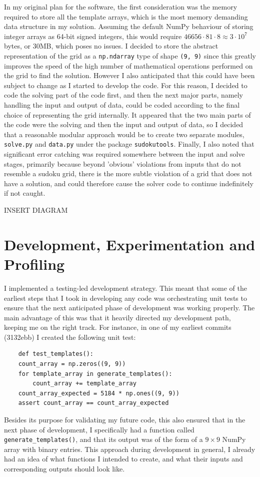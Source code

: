 \documentclass[12pt]{article}
\begin{document}
In my original plan for the software, the first consideration was the memory required to store all the template arrays, which is the most memory demanding data structure in my solution.
Assuming the default NumPy behaviour of storing integer arrays as 64-bit signed integers, this would require $46656\cdot81\cdot8\approx3\cdot10^7$ bytes, or 30MB, which poses no issues.
I decided to store the abstract representation of the grid as a \texttt{np.ndarray} type of shape \texttt{(9, 9)} since this greatly improves the speed of the high number of mathematical operations performed on the grid to find the solution.
However I also anticipated that this could have been subject to change as I started to develop the code.
For this reason, I decided to code the solving part of the code first, and then the next major parts, namely handling the input and output of data, could be coded according to the final choice of representing the grid internally.
It appeared that the two main parts of the code were the solving and then the input and output of data, so I decided that a reasonable modular approach would be to create two separate modules, \texttt{solve.py} and \texttt{data.py} under the package \texttt{sudokutools}.
Finally, I also noted that significant error catching was required somewhere between the input and solve stages, primarily because beyond 'obvious' violations from inputs that do not resemble a sudoku grid, there is the more subtle violation of a grid that does not have a solution, and could therefore cause the solver code to continue indefinitely if not caught.


INSERT DIAGRAM
\section*{Development, Experimentation and Profiling}
I implemented a testing-led development strategy.
This meant that some of the earliest steps that I took in developing any code was orchestrating unit tests to ensure that the next anticipated phase of development was working properly.
The main advantage of this was that it heavily directed my development path, keeping me on the right track.
For instance, in one of my earliest commits (3132ebb) I created the following unit test:

\begin{lstlisting}
    def test_templates():
    count_array = np.zeros((9, 9))
    for template_array in generate_templates():
        count_array += template_array
    count_array_expected = 5184 * np.ones((9, 9))
    assert count_array == count_array_expected
\end{lstlisting}
Besides its purpose for validating my future code, this also ensured that in the next phase of development, I specifically had a function called \texttt{generate\_templates()}, and that its output was of the form of a $9\times9$ NumPy array with binary entries.
This approach during development in general, I already had an idea of what functions I intended to create, and what their inputs and corresponding outputs should look like.
\end{document}
